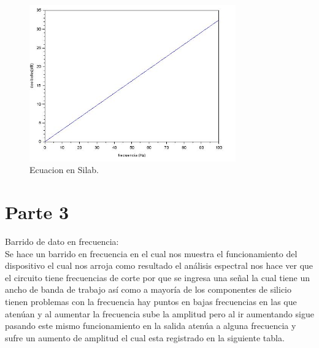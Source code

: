 \documentclass[12pt]{report}
\begin{document}
\begin{figure}[h!]
  \centering
    \includegraphics[width=3.5in]{silabimag}
  \caption{Ecuacion en Silab.}
\end{figure}
\section{Parte 3}
Barrido de dato en frecuencia:\\
Se hace un barrido en frecuencia en el cual nos muestra el funcionamiento del dispositivo el cual nos arroja como resultado el análisis espectral nos hace ver que el circuito tiene frecuencias de corte por que se ingresa una señal la cual tiene un ancho de banda de trabajo así como a mayoría de los componentes de silicio tienen problemas con la frecuencia hay puntos en bajas frecuencias en las que atenúan y al aumentar la frecuencia sube la amplitud pero  al ir aumentando sigue pasando este mismo funcionamiento en la salida atenúa a alguna frecuencia y sufre un aumento de amplitud el cual esta registrado en la siguiente tabla.\\
\end{document}
